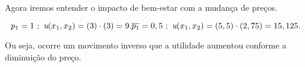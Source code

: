 \documentclass[a4paper, 12pt]{article} %
\begin{document}
\begin{flushleft}
\begin{center}
	Agora iremos entender o impacto de bem-estar com a mudança de preços.
\end{center}

\begin{equation}
p_{1} = 1 \ ; \ \textit{u}(x_{1}, x_{2}) = (3) \cdot (3) = 9. 
$$\\$$
\overline{p_{1}} = 0,5 \ ; \ \textit{u}(x_{1}, x_{2}) = (5,5) \cdot (2,75) = 15,125.
\end{equation}

\begin{center}
	Ou seja, ocorre um movimento inverso que a utilidade aumentou conforme a diminuição do preço.
\end{center}


\end{flushleft}
\end{document}
